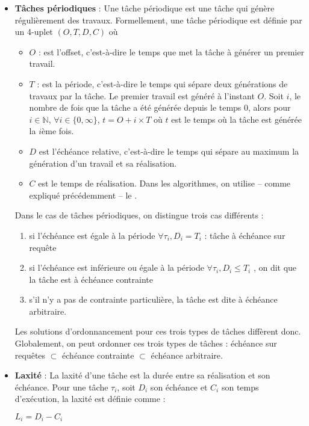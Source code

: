 \begin{itemize}
		\item \textbf{Tâches périodiques} :
		Une tâche périodique est une tâche qui génère régulièrement des travaux.  
		Formellement, une tâche périodique est définie par un 4-uplet $(O, T, D, C)$ où \medskip
		\begin{itemize}
			\item \textbf{$O$} : est l'\og offset\fg{}, c'est-à-dire le temps que met la tâche à générer un premier travail.
			\item \textbf{$T$} : est la période, c'est-à-dire le temps qui sépare deux générations de travaux par la tâche. 
			Le premier travail est généré à l'instant $O$. Soit $i$, le nombre de fois que la tâche a été générée depuis le temps $0$,			
			 alors pour $i \in \mathbb{N}$, $\forall i \in \{0, \infty \}$,  $t = O + i\times T$ 
			où $t$ est le temps où la tâche est générée la $i$ème fois.
			\item \textbf{$D$} est l'échéance relative, c'est-à-dire le temps qui sépare au maximum la génération 
			d'un travail et sa réalisation.
			\item \textbf{$C$} est le temps de réalisation. Dans les algorithmes, on utilise -- comme expliqué précédemment -- le .
		\end{itemize}	
		Dans le cas de tâches périodiques, on distingue trois cas différents : \medskip
		\begin{enumerate}
			\item si l'échéance est égale à la période $\forall \tau_i, D_i = T_i$ : tâche à \label{echeancesurrequete}échéance sur requête
			\item si l'échéance est inférieure ou égale à la période $\forall \tau_i, D_i \leq T_i $ , on dit que la tâche est à \label{echeancecontrainte} échéance contrainte
			\item s'il n'y a pas de contrainte particulière, la tâche est dite \og à échéance arbitraire\fg{}\label{echeancearbitraire}.
		\end{enumerate}
		Les solutions d'ordonnancement pour ces trois types de tâches diffèrent donc. 
		Globalement, on peut ordonner ces trois types de tâches : \medskip
		échéance sur requêtes $\subset$ échéance contrainte $\subset$ échéance arbitraire.
		
		\item \textbf{Laxité} : La laxité d'une tâche est la durée entre sa réalisation et son échéance. 
		Pour une tâche $\tau_i$, soit $D_i$ son échéance et $C_i$ son temps d'exécution, la laxité est définie comme :
		\vspace{-0.5cm}
		\begin{center}
			$L_i = D_i - C_i$
		\end{center}
		

\end{itemize}
